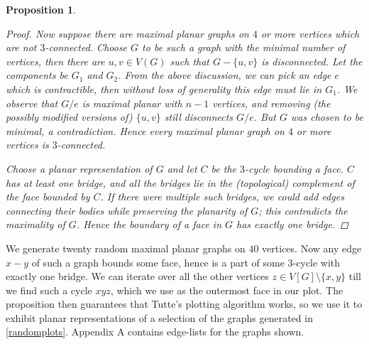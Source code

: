 \documentclass[12pt]{article}
\newtheorem*{prop}{Proposition}
\begin{document}
\begin{prop}
\begin{proof}
        Now suppose there are maximal planar graphs on \(4\) or more vertices
        which are not \(3\)-connected. Choose \(G\) to be such a graph with the
        minimal number of vertices, then there are \(u,v\in V(G)\) such that
        \(G-\{u,v\}\) is disconnected. Let the components be \(G_1\) and
        \(G_2\). From the above discussion, we can pick an edge \(e\)
        which is contractible, then without loss of generality this edge must
        lie in \(G_1\). We observe that \(G/e\) is maximal planar with \(n-1\)
        vertices, and removing (the possibly modified versions of) \(\{u,v\}\)
        still disconnects \(G/e\). But \(G\) was chosen to be minimal, a
        contradiction. Hence every maximal planar graph on \(4\) or more
        vertices is \(3\)-connected.

        Choose a planar representation of \(G\) and let \(C\) be the \(3\)-cycle
        bounding a face. \(C\) has at least one bridge, and all the bridges lie
        in the (topological) complement of the face bounded by \(C\). If there
        were multiple such bridges, we could add edges connecting their bodies
        while preserving the planarity of \(G\); this contradicts the maximality
        of \(G\). Hence the boundary of a face in \(G\) has exactly one bridge.
    \end{proof}
\end{prop}

We generate twenty random maximal
planar graphs on \(40\) vertices. Now any edge \(x-y\) of such a graph bounds some face,
hence is a part of some \(3\)-cycle with exactly one bridge. We can iterate over
all the other vertices \(z\in V[G]\setminus \{x,y\}\) till we find such a cycle
\(xyz\), which we use as the outermost face in our plot. The proposition then
guarantees that Tutte's plotting algorithm works, so we use it to exhibit
planar representations of a selection of the graphs generated in
\cref{randomplots}. Appendix A contains edge-lists for the graphs shown.
\end{document}

